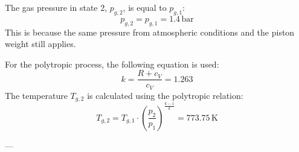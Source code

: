 The gas pressure in state 2, \( p_{g,2} \), is equal to \( p_{g,1} \):  
\[
p_{g,2} = p_{g,1} = 1.4 \, \text{bar}
\]  
This is because the same pressure from atmospheric conditions and the piston weight still applies.  

For the polytropic process, the following equation is used:  
\[
k = \frac{R + c_V}{c_V} = 1.263
\]  
The temperature \( T_{g,2} \) is calculated using the polytropic relation:  
\[
T_{g,2} = T_{g,1} \cdot \left( \frac{p_2}{p_1} \right)^{\frac{k-1}{k}} = 773.75 \, \text{K}
\]  

---